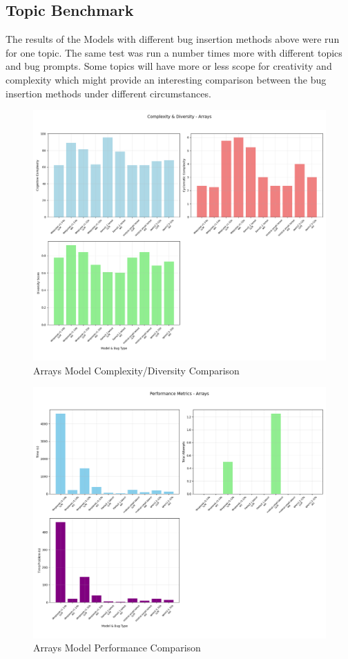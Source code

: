 \documentclass[12pt]{extarticle}
\begin{document}
\subsection{Topic Benchmark}

The results of the Models with different bug insertion methods above were run for one topic. The same test was run a number times more with different topics and bug prompts. Some topics will have more or less scope for creativity and complexity which might provide an interesting comparison between the bug insertion methods under different circumstances.

\begin{figure}[H]
\centering
\includegraphics[width=0.65\linewidth]{Images/Complexity_Comparison_Arrays.png}
\caption{Arrays Model Complexity/Diversity Comparison}
\label{fig:Complexity_Comparison_Arrays}
\end{figure}
    

\begin{figure}[H]
\centering
\includegraphics[width=0.65\linewidth]{Images/Model_Comparison_Arrays.png}
\caption{Arrays Model Performance Comparison}
\label{fig:Model_Comparison_Arrays}
\end{figure}
\end{document}
